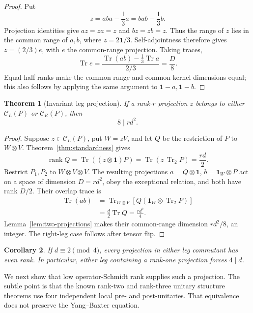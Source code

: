 \documentclass[11pt]{article}
\newtheorem{theorem}{Theorem}[section]
\newtheorem{corollary}[theorem]{Corollary}
\theoremstyle{definition}
\theoremstyle{remark}
\newcommand{\Id}{\mathbf 1}
\newcommand{\Tr}{\operatorname{Tr}}
\newcommand{\rank}{\operatorname{rank}}
\newcommand{\cC}{\mathcal C}
\begin{document}
\begin{proof}
Put
\[
  z=aba-\frac13a=bab-\frac13b.
\]
Projection identities give \(az=za=z\) and \(bz=zb=z\). Thus the range
of \(z\) lies in the common range of \(a,b\), where \(z=2\Id/3\).
Self-adjointness therefore gives \(z=(2/3)e\), with \(e\) the
common-range projection. Taking traces,
\[
  \Tr e
  =\frac{\Tr(ab)-\frac13\Tr a}{2/3}
  =\frac D8.
\]
Equal half ranks make the common-range and common-kernel dimensions equal;
this also follows by applying the same argument to \(\Id-a,\Id-b\).
\end{proof}

\begin{theorem}[Invariant leg projection]\label{thm:leg-projection}
If a rank-\(r\) projection \(z\) belongs to either
\(\cC_L(P)\) or \(\cC_R(P)\), then
\[
  \boxed{8\mid rd^2.}
\]
\end{theorem}

\begin{proof}
Suppose \(z\in\cC_L(P)\), put \(W=zV\), and let \(Q\) be the
restriction of \(P\) to \(W\otimes V\). Theorem~\ref{thm:standardness}
gives
\[
  \rank Q
  =\Tr((z\otimes\Id)P)
  =\Tr\!\left(z\,\Tr_2P\right)
  =\frac{rd}{2}.
\]
Restrict \(P_1,P_2\) to \(W\otimes V\otimes V\). The resulting
projections \(a=Q\otimes\Id\), \(b=\Id_W\otimes P\) act on a space of
dimension \(D=rd^2\), obey the exceptional relation, and both have rank
\(D/2\). Their overlap trace is
\[
\begin{aligned}
 \Tr(ab)
 &=\Tr_{W\otimes V}\!
   \left[Q(\Id_W\otimes\Tr_2P)\right]\\
 &=\frac d2\Tr Q=\frac{rd^2}{4}.
\end{aligned}
\]
Lemma~\ref{lem:two-projections} makes their common-range dimension
\(rd^2/8\), an integer. The right-leg case follows after tensor flip.
\end{proof}

\begin{corollary}\label{cor:odd-leg}
If \(d\equiv2\pmod4\), every projection in either leg commutant has even
rank. In particular, either leg containing a rank-one projection forces
\(4\mid d\).
\end{corollary}

We next show that low operator-Schmidt rank supplies such a projection.
The subtle point is that the known rank-two and rank-three unitary
structure theorems use four independent local pre- and post-unitaries.
That equivalence does not preserve the Yang--Baxter equation.
\end{document}
